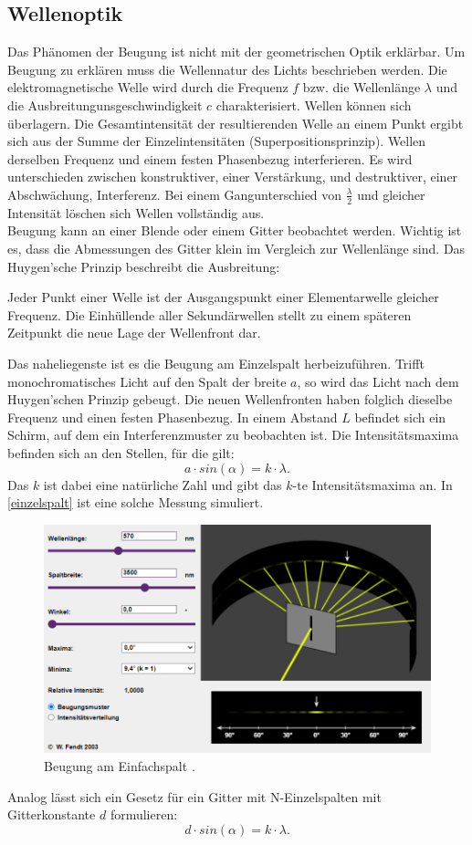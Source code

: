 \subsection{Wellenoptik}
Das Phänomen der Beugung ist nicht mit der geometrischen Optik erklärbar. Um Beugung zu erklären muss die Wellennatur des Lichts beschrieben werden.
Die elektromagnetische Welle wird durch die Frequenz $f$ bzw. die Wellenlänge $\lambda$ und die Ausbreitungunsgeschwindigkeit $c$ charakterisiert.
Wellen können sich überlagern. Die Gesamtintensität der resultierenden Welle an einem Punkt ergibt sich aus der Summe der Einzelintensitäten (Superpositionsprinzip).
Wellen derselben Frequenz und einem festen Phasenbezug interferieren. Es wird unterschieden zwischen konstruktiver, einer Verstärkung, und destruktiver, einer
Abschwächung, Interferenz. Bei einem Gangunterschied von $\frac{\lambda}{2}$ und gleicher Intensität löschen sich Wellen vollständig aus.\\
Beugung kann an einer Blende oder einem Gitter beobachtet werden. Wichtig ist es, dass die Abmessungen des Gitter klein im Vergleich zur Wellenlänge sind. Das Huygen'sche 
Prinzip beschreibt die Ausbreitung:\\
\begin{itshape}
    Jeder Punkt einer Welle ist der Ausgangspunkt einer Elementarwelle gleicher Frequenz. Die Einhüllende aller Sekundärwellen stellt zu einem späteren Zeitpunkt die
    neue Lage der Wellenfront dar.
\end{itshape}
Das naheliegenste ist es die Beugung am Einzelspalt herbeizuführen. Trifft monochromatisches Licht auf den Spalt der breite $a$, so wird das Licht nach dem Huygen'schen 
Prinzip gebeugt. Die neuen Wellenfronten haben folglich dieselbe Frequenz und einen festen Phasenbezug. In einem Abstand $L$ befindet sich ein Schirm, auf dem ein 
Interferenzmuster zu beobachten ist. Die Intensitätsmaxima befinden sich an den Stellen, für die gilt:
\begin{equation*}
    a \cdot sin(\alpha) = k\cdot\lambda.
\end{equation*}
Das $k$ ist dabei eine natürliche Zahl und gibt das $k\text{-te}$ Intensitätsmaxima an. In \autoref{einzelspalt} ist eine solche Messung simuliert.
\begin{figure}[H]
    \centering
    \includegraphics[width=\textwidth]{img/beugung.png}
    \caption{Beugung am Einfachspalt \cite{Einzelspalt}.}
    \label{einzelspalt}
\end{figure}
Analog lässt sich ein Gesetz für ein Gitter mit N-Einzelspalten mit Gitterkonstante $d$ formulieren:
\begin{equation*}
    d \cdot sin(\alpha) = k\cdot\lambda.
\end{equation*}
